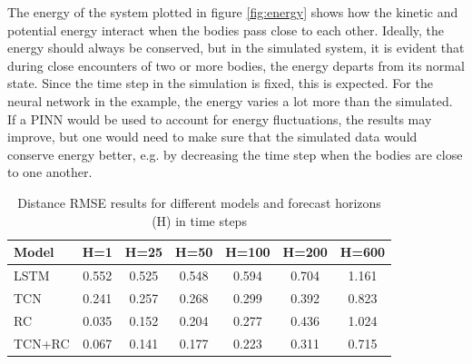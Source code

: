 \documentclass[%
 reprint,
 amsmath,amssymb,
 aps,
]{revtex4-2}
\begin{document}
The energy of the system plotted in figure \ref{fig:energy} shows how the kinetic and potential energy interact when the bodies pass close to each other. Ideally, the energy should always be conserved, but in the simulated system, it is evident that during close encounters of two or more bodies, the energy departs from its normal state. Since the time step in the simulation is fixed, this is expected. For the neural network in the example, the energy varies a lot more than the simulated. If a PINN would be used to account for energy fluctuations, the results may improve, but one would need to make sure that the simulated data would conserve energy better, e.g. by decreasing the time step when the bodies are close to one another.


\begin{table}[htbp]
    \centering
    \caption{Distance RMSE results for different models and forecast horizons (H) in time steps}
    \label{tab:distance_rmse_updated}
    \begin{tabular}{|l|c|c|c|c|c|c|}
        \hline
        \textbf{Model} & \textbf{H=1} & \textbf{H=25} & \textbf{H=50} & \textbf{H=100} & \textbf{H=200} & \textbf{H=600} \\
        \hline
        LSTM & 0.552 & 0.525 & 0.548 & 0.594 & 0.704 & 1.161 \\
        \hline
        TCN & 0.241 & 0.257 & 0.268 & 0.299 & 0.392 & 0.823 \\
        \hline
        RC & 0.035 & 0.152 & 0.204 & 0.277 & 0.436 & 1.024 \\
        \hline
        TCN+RC & 0.067 & 0.141 & 0.177 & 0.223 & 0.311 & 0.715 \\
        \hline
    \end{tabular}
\end{table}
\end{document}
